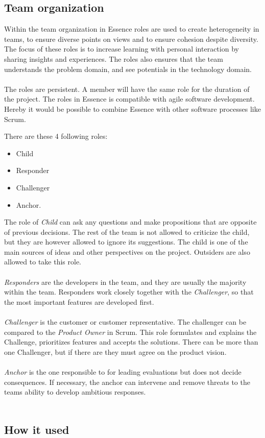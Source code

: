 \subsection{Team organization}
Within the team organization in Essence roles are used to create heterogeneity in teams, to ensure diverse points on views and to ensure cohesion despite diversity.
The focus of these roles is to increase learning with personal interaction by sharing insights and experiences.
The roles also ensures that the team understands the problem domain, and see potentials in the technology domain.
\\\\
The roles are persistent. 
A member will have the same role for the duration of the project.
The roles in Essence is compatible with agile software development. 
Hereby it would be possible to combine Essence with other software processes like Scrum.

There are these 4 following roles:
\begin{itemize}
    \item Child
    \item Responder
    \item Challenger
    \item Anchor.
\end{itemize}
The role of \textit{Child} can ask any questions and make propositions that are opposite of previous decisions.
The rest of the team is not allowed to criticize the child, but they are however allowed to ignore its suggestions.
The child is one of the main sources of ideas and other perspectives on the project.
Outsiders are also allowed to take this role.
\\\\
\textit{Responders} are the developers in the team, and they are usually the majority within the team.
Responders work closely together with the \textit{Challenger}, so that the most important features are developed first.
\\\\
\textit{Challenger} is the customer or customer representative. 
The challenger can be compared to the \textit{Product Owner} in Scrum.
This role formulates and explains the Challenge, prioritizes features and accepts the solutions.
There can be more than one Challenger, but if there are they must agree on the product vision.
\\\\
\textit{Anchor} is the one responsible to for leading evaluations but does not decide consequences.
If necessary, the anchor can intervene and remove threats to the teams ability to develop ambitious responses. 
\\\\
\subsection{How it used}